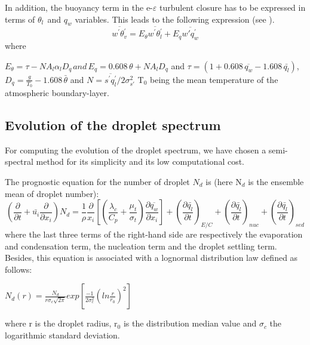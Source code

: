 In addition, the buoyancy term in the e-$\varepsilon $ turbulent closure has
to be expressed in terms of $\theta_{l\, }$ and $ q_{w}$ variables. This
leads to the following expression (see \cite{Bouzereau:2007}).
\begin{equation}
\overline{w^{'}\theta_{v}^{'}}=E_{\theta }\overline{w^{'}\theta
_{l}^{'}}+E_{q}\overline{w'q_{w}^{'}}
\end{equation}
where

\begin{equation}
\end{equation}
$E_{\theta }=\tau -NA_{l}\alpha_{l}D_{q\, }and\, E_{q}=0.608 \, \theta
+NA_{l}D_{q}$ and $\tau =\left( 1+0.608 \, \overline {q_{w}}-1.608 \, \bar{q_{l}}
\right)$,
$D_{q}=\frac{g}{T_{0}}-1.608 \, \bar{\theta }$ and
$N=\overline{s^{'}q_{l}^{'}}/2\sigma_{s'}^{2}$
T$_{0}$ being the mean temperature
of the atmospheric boundary-layer.

\subsection{ Evolution of the droplet spectrum }
For computing the evolution of the droplet spectrum, we have chosen a
semi-spectral method for its simplicity and its low computational cost.

The prognostic equation for the number of droplet $N_{d}$ is (here N$_{d}$ is
the ensemble mean of droplet number):
\begin{equation}
\left( \frac{\partial }{\partial t}+\bar{u_{i}}\frac{\partial }{\partial
x_{i}} \right)N_{d}=\frac{1}{\rho }\frac{\partial }{x_{i}}\left[ \left(
\frac{\lambda_{c}}{C_{p}}+\frac{\mu_{t}}{\sigma_{t}}
\right)\frac{\partial \overline {q_{w}}}{\partial x_{i}} \right]+\left(
\frac{\partial \bar{q_{l}}}{\partial t} \right)_{E/C}+\left( \frac{\partial
\bar{q_{l}}}{\partial t} \right)_{nuc}+\left( \frac{\partial
\bar{q_{l}}}{\partial t} \right)_{sed}
\end{equation}
where the last three terms of the right-hand side are respectively the
evaporation and condensation term, the nucleation term and the droplet
settling term. Besides, this equation is associated with a lognormal
distribution law defined as follows:

$N_{d}\left( r \right)=\frac{N_{d}}{r\sigma_{c}\sqrt {2\pi } }exp\left[
\frac{-1}{2\sigma_{c}^{2}}\left( ln\frac{r}{r_{0}} \right)^{2} \right]$

where r is the droplet radius, r$_{0}$ is the distribution median value and
$\sigma_{c}$ the logarithmic standard deviation.

